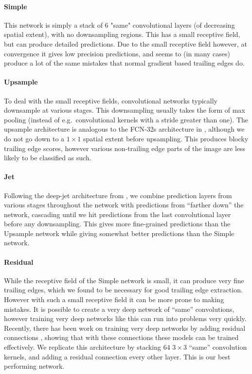 \paragraph{Simple}
This network is simply a stack of $6$ "same" convolutional layers (of decreasing spatial extent), with no downsampling regions.
This has a small receptive field, but can produce detailed predictions.
Due to the small receptive field however, at convergence it gives low precision predictions, and seems to (in many cases) produce a lot of the same mistakes that normal gradient based trailing edges do.

\paragraph{Upsample}
To deal with the small receptive fields, convolutional networks typically downsample at various stages. 
This downsampling usually takes the form of max pooling (instead of e.g.\ convolutional kernels with a stride greater than one).
The upsample architecture is analogous to the FCN-32s architecture in \cite{long2015fully}, although we do not go down to a $1\times1$ spatial extent before upsampling.
This produces blocky trailing edge scores, however various non-trailing edge parts of the image are less likely to be classified as such. 

\paragraph{Jet}
Following the deep-jet architecture from \cite{long2015fully}, we combine prediction layers from various stages throughout the network with predictions from ``farther down'' the network, cascading until we hit predictions from the last convolutional layer before any downsampling.
This gives more fine-grained predictions than the Upsample network while giving somewhat better predictions than the Simple network.


\paragraph{Residual}
While the receptive field of the Simple network is small, it can produce very fine trailing edges, which we found to be necessary for good trailing edge extraction.
However with such a small receptive field it can be more prone to making mistakes.
It is possible to create a very deep network of ``same'' convolutions, however training very deep networks like this can run into problems very quickly.
Recently, there has been work on training very deep networks by adding residual connections \cite{he2015deep}, showing that with these connections these models can be trained effectively.
We replicate this architecture by stacking $64$ $3\times3$ ``same'' convolution kernels, and adding a residual connection every other layer.
This is our best performing network.

